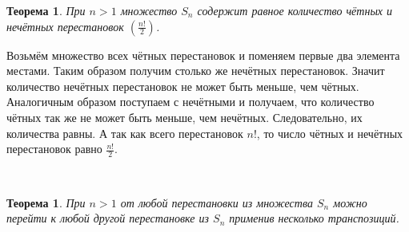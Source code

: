 \newtheorem*{t3_3}{Теорема}
\begin{t3_3}
	При $n > 1$ множество $S_ n$ содержит равное количество чётных и нечётных перестановок $(\frac{n!}{2})$.
\end{t3_3}
\begin{Proof}
	Возьмём множество всех чётных перестановок и поменяем первые два элемента местами. Таким
	образом получим столько же нечётных перестановок. Значит количество нечётных перестановок не
	может быть меньше, чем чётных. Аналогичным образом поступаем с нечётными и получаем, что количество
	чётных так же не может быть меньше, чем нечётных. Следовательно, их количества равны. А так как всего
	перестановок $n!$, то число чётных и нечётных перестановок равно $\frac{n!}{2}$.
\end{Proof}\\
\newtheorem*{t3_4}{Теорема}
\begin{t3_4}
	При $n > 1$ от любой перестановки из множества $S_n$ можно перейти к любой другой перестановке из $S_n$ применив несколько транспозиций.
\end{t3_4}

